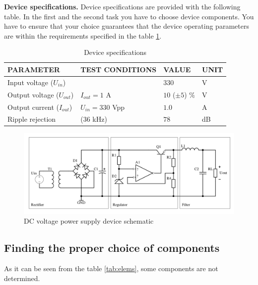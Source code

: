 \documentclass{article}
\begin{document}
\textbf{Device specifications.} Device specifications are provided with 
the following table. In the first and the second task you have to choose device 
components. You have to ensure that your choice guarantees that the 
device operating parameters are within the requirements specified in the 
table \ref{tab:spec}.

\begin{table}[h!]
	\caption{Device specifications}
	\label{tab:spec}
	\begin{tabularx}{\linewidth}{|X|X|X|X|} \hline
		PARAMETER & TEST CONDITIONS & VALUE & UNIT \\ \hline
		Input voltage ($U_{in}$)&  & $330$ & V \\ \hline 
		Output voltage ($U_{out}$)& $I_{out} = 1$ A & $10$ ($\pm5$) \% & V \\ 
		\hline
		Output current ($I_{out}$) & $U_{in} = 330$ Vpp & $1.0$ & A \\ \hline
		Ripple rejection & (36 kHz) & $78$ & dB \\ \hline
	\end{tabularx}
\end{table}

\begin{figure}
	\centering
	\includegraphics[width=\linewidth]{reg.png}
	\caption{DC voltage power supply device schematic}
	\label{fig:schematic}
\end{figure}

\clearpage

\subsection{Finding the proper choice of components}
\label{ele:task:1}
As it can be seen from the table \ref{tab:elems}, some components are not 
determined. 
\end{document}
